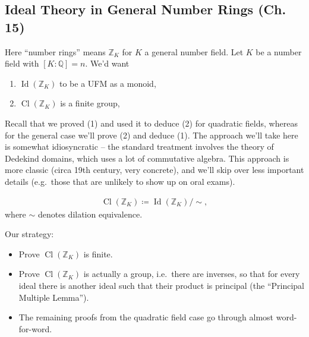 \hypertarget{ideal-theory-in-general-number-rings-ch.-15}{%
\subsection{Ideal Theory in General Number Rings (Ch.
15)}\label{ideal-theory-in-general-number-rings-ch.-15}}

\begin{remark}

Here ``number rings'' means \({\mathbb{Z}}_K\) for \(K\) a general
number field. Let \(K\) be a number field with
\([K: {\mathbb{Q}}] = n\). We'd want

\begin{enumerate}
\def\labelenumi{\arabic{enumi}.}
\tightlist
\item
  \(\operatorname{Id}({\mathbb{Z}}_K)\) to be a UFM as a monoid,
\item
  \({ \operatorname{Cl}} ({\mathbb{Z}}_K)\) is a finite group,
\end{enumerate}

Recall that we proved (1) and used it to deduce (2) for quadratic
fields, whereas for the general case we'll prove (2) and deduce (1). The
approach we'll take here is somewhat idiosyncratic -- the standard
treatment involves the theory of Dedekind domains, which uses a lot of
commutative algebra. This approach is more classic (circa 19th century,
very concrete), and we'll skip over less important details (e.g.~those
that are unlikely to show up on oral exams).

\end{remark}

\begin{definition}

\begin{align*}
{ \operatorname{Cl}} ({\mathbb{Z}}_K) \coloneqq\operatorname{Id}({\mathbb{Z}}_K)/ \sim
,\end{align*}
where \(\sim\) denotes dilation equivalence.

\end{definition}

\begin{remark}

Our strategy:

\begin{itemize}
\tightlist
\item
  Prove \({ \operatorname{Cl}} ({\mathbb{Z}}_K)\) is finite.
\item
  Prove \({ \operatorname{Cl}} ({\mathbb{Z}}_K)\) is actually a group,
  i.e.~there are inverses, so that for every ideal there is another
  ideal such that their product is principal (the ``Principal Multiple
  Lemma'').
\item
  The remaining proofs from the quadratic field case go through almost
  word-for-word.
\end{itemize}

\end{remark}

